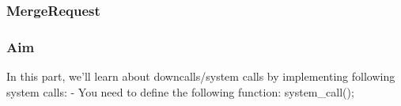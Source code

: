 \documentclass[]{book}
\newenvironment{Shaded}{}{}
\newcommand{\KeywordTok}[1]{\textbf{{#1}}}
\newcommand{\NormalTok}[1]{{#1}}
\begin{document}
\subsubsection*{MergeRequest}\label{mergerequest-12}

\begin{Shaded}
\end{Shaded}

\subsubsection*{Aim}\label{aim-12}

In this part, we'll learn about downcalls/system calls by implementing
following system calls: - You need to define the following function:
system\_call();
\end{document}
